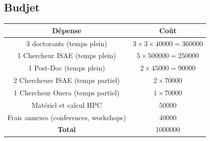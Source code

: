 \documentclass[french]{article}
\begin{document}
\subsection{Budjet}
\begin{center}
\begin{tabular}{|c|c|}
	\hline
	D\'epense & Co\^{u}t \\
	\hline
	3 doctorants (temps plein) & $3\times 3\times 40000=360000$  \\
	1 Chercheur ISAE (temps plein) & $5\times 500000=250000$ \\
	1 Post-Doc (temps plein) & $2\times 45000=90000$ \\
	2 Chercheurs ISAE (temps partiel)& $2\times 70000$ \\
	1 Chercheur Onera (temps partiel)& $1\times 70000$ \\
	Matériel  et calcul HPC & $50000$ \\
	Frais annexes (conferences, workshops) & $40000$ \\
	\hline
	\textbf{Total} & 1000000 \\
	\hline
\end{tabular}
\end{center}






\end{document}
